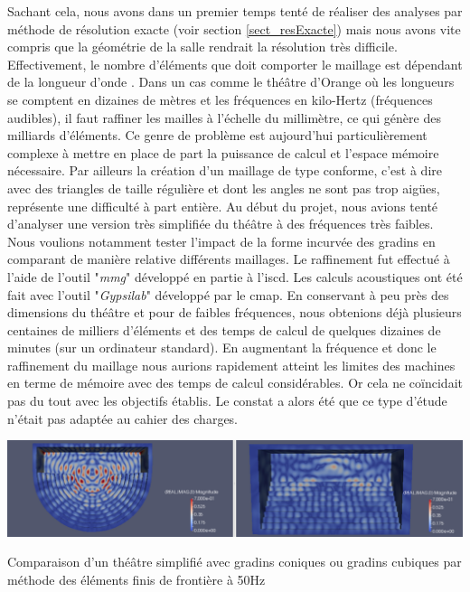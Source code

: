 Sachant cela, nous avons dans un premier temps tenté de réaliser des analyses par méthode de résolution exacte (voir section \ref{sect_resExacte}) mais nous avons vite compris que la géométrie de la salle rendrait la résolution très difficile. Effectivement, le nombre d'éléments que doit comporter le maillage est dépendant de la longueur d'onde \cite[p. 740]{beamtracing}. Dans un cas comme le théâtre d'Orange où les longueurs se comptent en dizaines de mètres et les fréquences en kilo-Hertz (fréquences audibles), il faut raffiner les mailles à l'échelle du millimètre, ce qui génère des milliards d'éléments. Ce genre de problème est aujourd'hui particulièrement complexe à mettre en place de part la puissance de calcul et l'espace mémoire nécessaire. Par ailleurs la création d'un maillage de type conforme, c'est à dire avec des triangles de taille régulière et dont les angles ne sont pas trop aigües, représente une difficulté à part entière.
Au début du projet, nous avions tenté d'analyser une version très simplifiée du théâtre à des fréquences très faibles. Nous voulions notamment tester l'impact de la forme incurvée des gradins en comparant de manière relative différents maillages. Le raffinement fut effectué à l'aide de l'outil "\textit{mmg}" \cite[github]{mmg} développé en partie à l'\gls{iscd}. Les calculs acoustiques ont été fait avec l'outil "\textit{Gypsilab}" \cite[github]{gypsilab} développé par le \gls{cmap}. En conservant à peu près des dimensions du théâtre et pour de faibles fréquences, nous obtenions déjà plusieurs centaines de milliers d'éléments et des temps de calcul de quelques dizaines de minutes (sur un ordinateur standard). En augmentant la fréquence et donc le raffinement du maillage nous aurions rapidement atteint les limites des machines en terme de mémoire avec des temps de calcul considérables. Or cela ne coïncidait pas du tout avec les objectifs établis. Le constat a alors été que ce type d'étude n'était pas adaptée au cahier des charges.

\begin{figureth}
	\includegraphics[width=\linewidth]{images/BEM}
	\caption{Comparaison d'un théâtre simplifié avec gradins coniques ou gradins cubiques par méthode des éléments finis de frontière à 50Hz}
	\label{BEM}
\end{figureth}

